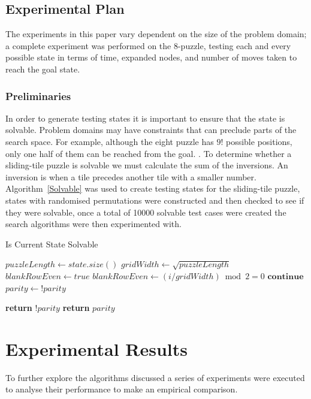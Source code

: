 \documentclass[final]{cmpreport}
\begin{document}
\subsection{Experimental Plan}
The experiments in this paper vary dependent on the size of the problem domain; a complete experiment was performed on the 8-puzzle, testing each and every possible state in terms of time, expanded nodes, and number of moves taken to reach the goal state.
\subsubsection{Preliminaries}
In order to generate testing states it is important to ensure that the state is solvable. Problem domains may have constraints that can preclude parts of the search space. For example, although the eight puzzle has $9!$ possible positions, only one half of them can be reached from the goal. \citep{DBLP:journals/ci/CulbersonS98}. To determine whether a sliding-tile puzzle is solvable we must calculate the sum of the inversions.
An inversion is when a tile precedes another tile with a smaller number. 
Algorithm~\ref{Solvable} was used to create testing states for the sliding-tile puzzle, states with randomised permutations were constructed and then checked to see if they were solvable, once a total of 10000 solvable test cases were created the search algorithms were then experimented with.
\begin{algorithm}
	\caption{Is Current State Solvable}\label{Solvable}
	\begin{algorithmic}[H]
		\State $puzzleLength \gets state.size()$
		\State 	$gridWidth \gets \sqrt{puzzleLength}$
		\State $blankRowEven \gets true$
		\State $blankRowEven \gets (i / gridWidth) \bmod 2 = 0$
		\State $\textbf{continue} $
		\State $parity \gets !parity$
		\EndIf
		\EndFor
		\EndIf 
		\EndFor
		
		\State \textbf{return} $!parity$
		\EndIf
		\State \textbf{return} $parity$
		
		\EndProcedure
	\end{algorithmic}	
\end{algorithm}	


\section{Experimental Results}\label{Experimental Results}
To further explore the algorithms discussed a series of experiments were executed to analyse their performance to make an empirical comparison. 
\end{document}
